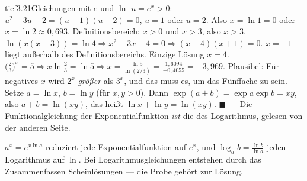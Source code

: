 \begin{loesungkarte}{tief}{3.21}{Gleichungen mit $e$ und $\ln$}
$u = e^{x} > 0$: $u^{2} - 3u + 2 = (u - 1)(u - 2) = 0$, $u = 1$ oder $u = 2$. Also $x = \ln1 = 0$ oder $x = \ln2\approx0{,}693$.
Definitionsbereich: $x > 0$ und $x > 3$, also $x > 3$. $\ln(x(x - 3)) = \ln4\Rightarrow x^{2} - 3x - 4 = 0\Rightarrow(x - 4)(x + 1) = 0$. $x = -1$ liegt außerhalb des Definitionsbereichs. Einzige Lösung $x = 4$.
$\bigl(\frac23\bigr)^{x} = 5\Rightarrow x\ln\frac23 = \ln5\Rightarrow x = \frac{\ln5}{\ln(2/3)} = \frac{1{,}6094}{-0{,}4055} = -3{,}969$. Plausibel: Für negatives $x$ wird $2^{x}$ \emph{größer} als $3^{x}$, und das muss es, um das Fünffache zu sein.
Setze $a = \ln x$, $b = \ln y$ (für $x, y > 0$). Dann $\exp(a + b) = \exp a\exp b = xy$, also $a + b = \ln(xy)$, das heißt $\ln x + \ln y = \ln(xy)$. $\blacksquare$ --- Die Funktionalgleichung der Exponentialfunktion \emph{ist} die des Logarithmus, gelesen von der anderen Seite.
\begin{mitnehmen}\kastentext
$a^{x} = e^{x\ln a}$ reduziert jede Exponentialfunktion auf $e^{x}$, und $\log_ab = \frac{\ln b}{\ln a}$ jeden Logarithmus auf $\ln$. Bei Logarithmusgleichungen entstehen durch das Zusammenfassen Scheinlösungen --- die Probe gehört zur Lösung.
\end{mitnehmen}
\end{loesungkarte}

